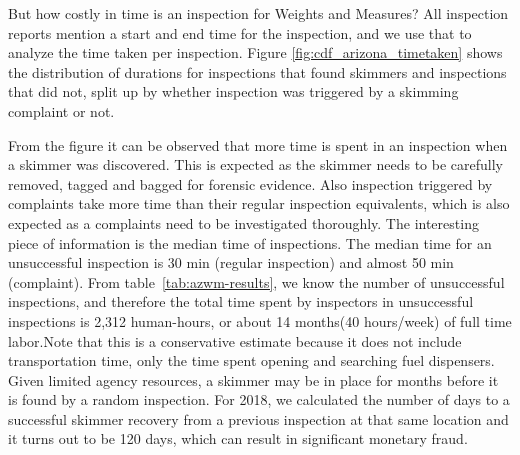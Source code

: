 But how costly in time is an inspection for Weights and Measures? All
inspection reports mention a start and end time for the inspection, and we use
that to analyze the time taken per inspection. Figure
\ref{fig:cdf_arizona_timetaken} shows the distribution of durations for
inspections that found skimmers and inspections that did not, split up by
whether inspection was triggered by a skimming complaint or not.

From the figure it can be observed that more time is spent in an inspection
when a skimmer was discovered. This is expected as the skimmer needs to be
carefully removed, tagged and bagged for forensic evidence. Also inspection
triggered by complaints take more time than their regular inspection
equivalents, which is also expected as a complaints need to be investigated
thoroughly. The interesting piece of information is the median time of
inspections. The median time for an unsuccessful inspection is 30 min (regular
inspection) and almost 50 min (complaint). From table~\ref{tab:azwm-results},
we know the number of unsuccessful inspections, and therefore the total time
spent by inspectors in unsuccessful inspections is 2,312 human-hours, or about
14 months(40 hours/week) of full time labor.Note that this is a conservative
estimate because it does not include transportation time, only the time spent
opening and searching fuel dispensers. Given limited agency resources, a
skimmer may be in place for months before it is found by a random inspection.
For 2018, we calculated the number of days to a successful skimmer recovery from a previous inspection at that same location and it turns out to be 120 days, which can result in significant monetary fraud.

